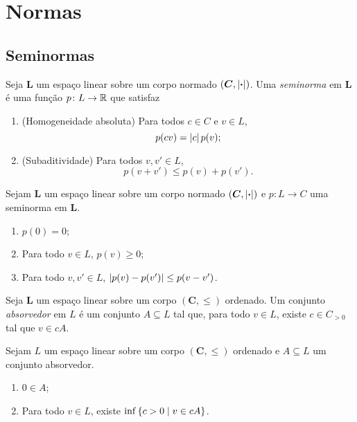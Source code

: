 \section{Normas}

\subsection{Seminormas}

\begin{definition}
Seja $\bm L$ um espaço linear sobre um corpo normado $(\bm C,\left\vert{\bm{\cdot}}\right\vert)$. Uma \emph{seminorma} em $\bm L$ é uma função $p\colon L \to \mathbb{R}$
que satisfaz
	\begin{enumerate}
	\item (Homogeneidade absoluta) Para todos $c \in C$ e $v \in L$,
		\begin{equation*}
		p(cv) = \left\vert{c}\right\vert p(v);
		\end{equation*}
	\item (Subaditividade) Para todos $v,v' \in L$,
		\begin{equation*}
		p(v + v') \leq p(v) + p(v').
		\end{equation*}
	\end{enumerate}
\end{definition}

\begin{proposition}
Sejam $\bm L$ um espaço linear sobre um corpo normado $(\bm C,\left\vert{\bm{\cdot}}\right\vert)$ e $p\colon L \to C$ uma seminorma em $\bm L$.
	\begin{enumerate}
	\item $p(0)=0$;
	\item Para todo $v \in L$, $p(v) \geq 0$;
	\item Para todo $v,v' \in L$, $\left\vert{p(v)-p(v')}\right\vert \leq p(v-v')$.
	\end{enumerate}
\end{proposition}

\begin{definition}
Seja $\bm L$ um espaço linear sobre um corpo $(\bm C,\leq)$ ordenado. Um conjunto \emph{absorvedor} em $L$ é um conjunto $A \subseteq L$ tal que, para todo $v \in L$, existe $c \in C_{>0}$ tal que $v \in cA$.
\end{definition}

\begin{proposition}
Sejam $L$ um espaço linear sobre um corpo $(\bm C,\leq)$ ordenado e $A \subseteq L$ um conjunto absorvedor.
	\begin{enumerate}
	\item $0 \in A$;
	\item Para todo $v \in L$, existe $\inf\left\{{c>0}\;\middle\vert\;{v \in cA}\right\}$.
	\end{enumerate}
\end{proposition}

